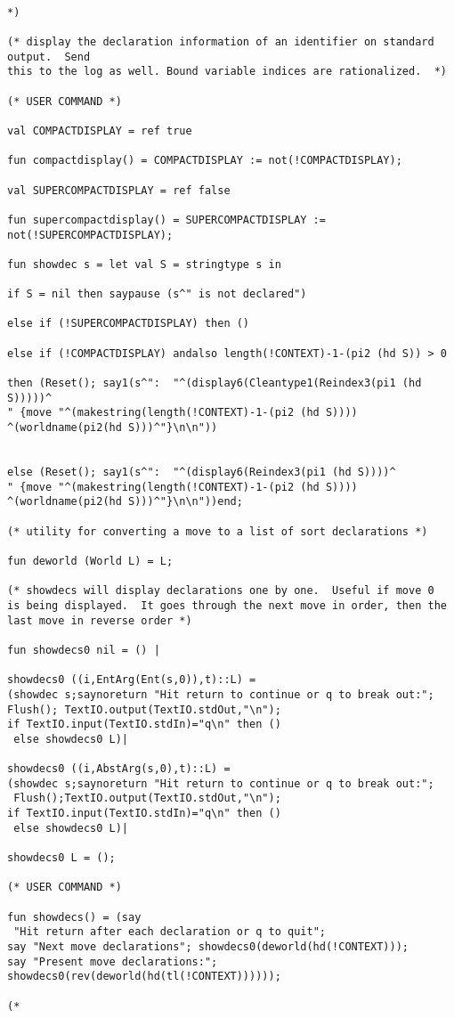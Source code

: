\documentclass{article}
\begin{document}
\begin{verbatim}

*)

(* display the declaration information of an identifier on standard output.  Send
this to the log as well. Bound variable indices are rationalized.  *)

(* USER COMMAND *)

val COMPACTDISPLAY = ref true

fun compactdisplay() = COMPACTDISPLAY := not(!COMPACTDISPLAY);

val SUPERCOMPACTDISPLAY = ref false

fun supercompactdisplay() = SUPERCOMPACTDISPLAY := not(!SUPERCOMPACTDISPLAY);

fun showdec s = let val S = stringtype s in 

if S = nil then saypause (s^" is not declared")

else if (!SUPERCOMPACTDISPLAY) then ()

else if (!COMPACTDISPLAY) andalso length(!CONTEXT)-1-(pi2 (hd S)) > 0

then (Reset(); say1(s^":  "^(display6(Cleantype1(Reindex3(pi1 (hd S)))))^
" {move "^(makestring(length(!CONTEXT)-1-(pi2 (hd S))))
^(worldname(pi2(hd S)))^"}\n\n"))


else (Reset(); say1(s^":  "^(display6(Reindex3(pi1 (hd S))))^
" {move "^(makestring(length(!CONTEXT)-1-(pi2 (hd S))))
^(worldname(pi2(hd S)))^"}\n\n"))end;

(* utility for converting a move to a list of sort declarations *)

fun deworld (World L) = L;

(* showdecs will display declarations one by one.  Useful if move 0
is being displayed.  It goes through the next move in order, then the
last move in reverse order *)

fun showdecs0 nil = () |

showdecs0 ((i,EntArg(Ent(s,0)),t)::L) = 
(showdec s;saynoreturn "Hit return to continue or q to break out:"; 
Flush(); TextIO.output(TextIO.stdOut,"\n");
if TextIO.input(TextIO.stdIn)="q\n" then ()
 else showdecs0 L)|

showdecs0 ((i,AbstArg(s,0),t)::L) = 
(showdec s;saynoreturn "Hit return to continue or q to break out:";
 Flush();TextIO.output(TextIO.stdOut,"\n");
if TextIO.input(TextIO.stdIn)="q\n" then ()
 else showdecs0 L)|

showdecs0 L = ();

(* USER COMMAND *)

fun showdecs() = (say
 "Hit return after each declaration or q to quit"; 
say "Next move declarations"; showdecs0(deworld(hd(!CONTEXT)));
say "Present move declarations:"; showdecs0(rev(deworld(hd(tl(!CONTEXT))))));

(*

\end{verbatim}
\end{document}
